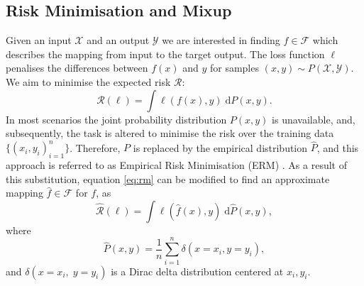 \documentclass{article}
\begin{document}
\subsection{Risk Minimisation and Mixup}
Given an input $\mathcal{X}$ and an output $\mathcal{Y}$ we are interested in finding $f \in \mathcal{F}$ which describes the mapping from input to the target output. The loss function $\ell$ penalises the differences between $f(x)$ and $y$ for samples $(x, y) \sim P(\mathcal{X}, \mathcal{Y})$. We aim to minimise the expected risk $\mathcal{R}$:
\begin{equation}
\mathcal{R}(\ell) = \int \ell(f(x), y)\; \mathrm{d}P(x, y).
\label{eq:rm}
\end{equation}
In most scenarios the joint probability distribution $P(x,y)$ is unavailable, and, subsequently, the task is altered to minimise the risk over the training data $\{(x_i,y_i)_{i=1}^{n}\}$. Therefore, $P$
is replaced by the empirical distribution $\hat{P}$, and this approach is referred to as Empirical Risk Minimisation (ERM) \cite{erm}. As a result of this substitution, equation \eqref{eq:rm} can be modified to find an approximate mapping $\hat{f} \in \mathcal{F}$ for $f$, as
\begin{equation}
\hat{\mathcal{R}}(\ell) = \int \ell(\hat{f}(x), y)\; \mathrm{d}\hat{P}(x, y),
\label{eq:erm}
\end{equation}
where
\begin{equation}
\hat{P}(x, y) = \frac{1}{n} \sum_{i=1}^{n} \delta(x=x_i, y=y_i),
\end{equation}
and $\delta(x=x_i, \;y=y_i)$ is a Dirac delta distribution centered at $x_i, y_i$. 
\end{document}
